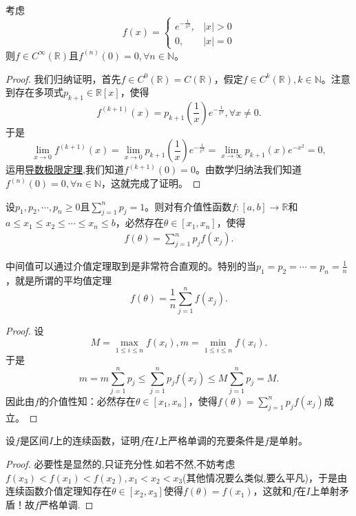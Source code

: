 \documentclass[lang=cn,newtx,10pt,scheme=chinese]{elegantbook}
\begin{document}
\begin{example}[\,\,经典光滑函数]\label{example:经典光滑函数}
考虑
\[
f(x)=
\begin{cases}
e^{-\frac{1}{x^2}}, &|x|>0 \\
0, &|x| = 0
\end{cases}
\]
则\(f\in C^{\infty}(\mathbb{R})\)且\(f^{(n)}(0)=0,\forall n\in\mathbb{N}\)。
\end{example}
\begin{proof}
我们归纳证明，首先\(f\in C^{0}(\mathbb{R}) = C(\mathbb{R})\)，假定\(f\in C^{k}(\mathbb{R}),k\in\mathbb{N}\)。注意到存在多项式\(p_{k + 1}\in\mathbb{R}[x]\)，使得
\[
f^{(k + 1)}(x)=p_{k + 1}\left(\frac{1}{x}\right)e^{-\frac{1}{x^2}},\forall x\neq0.
\]
于是
\[
\lim_{x\rightarrow0}f^{(k + 1)}(x)=\lim_{x\rightarrow0}p_{k + 1}\left(\frac{1}{x}\right)e^{-\frac{1}{x^2}}=\lim_{x\rightarrow\infty}p_{k + 1}(x)e^{-x^2}=0,
\]
运用\hyperref[theorem:导数极限定理]{导数极限定理},我们知道\(f^{(k + 1)}(0)=0\)。由数学归纳法我们知道\(f^{(n)}(0)=0,\forall n\in\mathbb{N}\)，这就完成了证明。
\end{proof}

\begin{theorem}[连续函数中间值定理]\label{theorem:连续函数中间值定理}
设\(p_1,p_2,\cdots,p_n\geqslant0\)且\(\sum_{j = 1}^{n}p_j = 1\)。则对有介值性函数\(f:[a,b]\to\mathbb{R}\)和\(a\leqslant x_1\leqslant x_2\leqslant\cdots\leqslant x_n\leqslant b\)，必然存在\(\theta\in[x_1,x_n]\)，使得
\begin{align*}
f(\theta)=\sum_{j = 1}^{n}p_jf(x_j).
\end{align*}
\end{theorem}
\begin{note}
中间值可以通过介值定理取到是非常符合直观的。特别的当\(p_1 = p_2=\cdots=p_n=\frac{1}{n}\)，就是所谓的平均值定理
\[
f(\theta)=\frac{1}{n}\sum_{j = 1}^{n}f(x_j).
\]
\end{note}
\begin{proof}
设
\[
M=\max_{1\leqslant i\leqslant n}f(x_i),m=\min_{1\leqslant i\leqslant n}f(x_i).
\]
于是
\[
m = m\sum_{j = 1}^{n}p_j\leqslant\sum_{j = 1}^{n}p_jf(x_j)\leqslant M\sum_{j = 1}^{n}p_j = M.
\]
因此由\(f\)的介值性知：必然存在\(\theta\in[x_1,x_n]\)，使得$f(\theta)=\sum_{j = 1}^{n}p_jf(x_j)$成立。
\end{proof}

\begin{proposition}[连续单射等价严格单调]\label{proposition:连续单射等价严格单调}
设\(f\)是区间\(I\)上的连续函数，证明\(f\)在\(I\)上严格单调的充要条件是\(f\)是单射。
\end{proposition}
\begin{proof}
必要性是显然的,只证充分性.如若不然,不妨考虑\(f(x_3)<f(x_1)<f(x_2),x_1<x_2<x_3\)(其他情况要么类似,要么平凡)，于是由连续函数介值定理知存在\(\theta\in[x_2,x_3]\)使得\(f(\theta)=f(x_1)\)，这就和\(f\)在\(I\)上单射矛盾！故\(f\)严格单调.
\end{proof}
\end{document}
